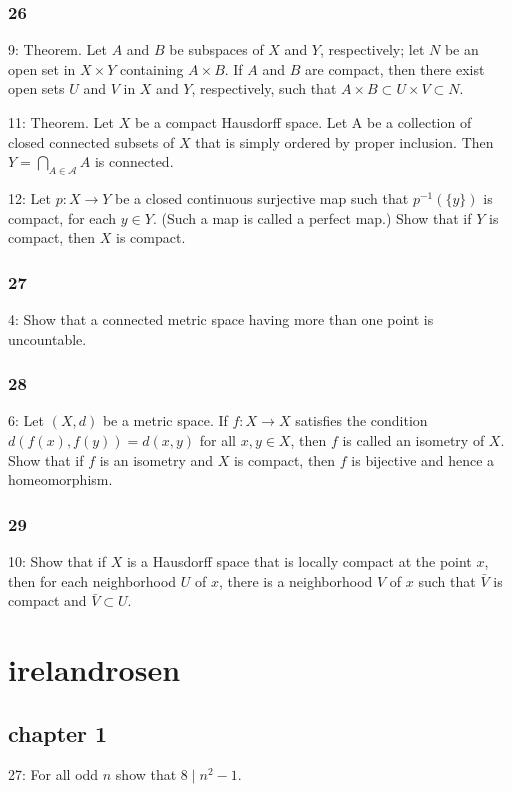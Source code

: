 \documentclass{article}
\begin{document}
\subsubsection*{26}
9: Theorem. Let $A$ and $B$ be subspaces of $X$ and $Y$, respectively; let $N$ be an open set in $X \times Y$ containing $A \times B$. If $A$ and $B$ are compact, then there exist open sets $U$ and $V$ in $X$ and $Y$, respectively, such that $A \times B \subset U \times V \subset N .$

11: Theorem. Let $X$ be a compact Hausdorff space. Let A be a collection of closed connected subsets of $X$ that is simply ordered by proper inclusion. Then $Y=\bigcap_{A \in \mathcal{A}} A$ is connected.

12: Let $p: X \rightarrow Y$ be a closed continuous surjective map such that $p^{-1}(\{y\})$ is compact, for each $y \in Y$. (Such a map is called a perfect map.) Show that if $Y$ is compact, then $X$ is compact.

\subsubsection*{27}
4: Show that a connected metric space having more than one point is uncountable.

\subsubsection*{28}
6: Let $(X, d)$ be a metric space. If $f: X \rightarrow X$ satisfies the condition $d(f(x), f(y))=d(x, y)$ for all $x, y \in X$, then $f$ is called an isometry of $X$. Show that if $f$ is an isometry and $X$ is compact, then $f$ is bijective and hence a homeomorphism. 

\subsubsection*{29}
10: Show that if $X$ is a Hausdorff space that is locally compact at the point $x$, then for each neighborhood $U$ of $x$, there is a neighborhood $V$ of $x$ such that $\bar{V}$ is compact and $\bar{V} \subset U$.

\section*{irelandrosen}
\subsection*{chapter 1}
27: For all odd $n$ show that $8 \mid n^{2}-1$.
\end{document}
